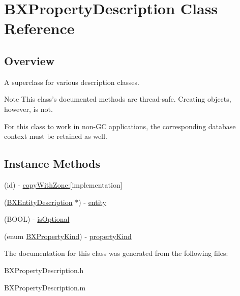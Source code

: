 \hypertarget{interface_b_x_property_description}{}\section{B\+X\+Property\+Description Class Reference}
\label{interface_b_x_property_description}


\subsection{Overview}
A superclass for various description classes. 

\begin{DoxyNote}{Note}
This class's documented methods are thread-\/safe. Creating objects, however, is not. 

For this class to work in non-\/\+G\+C applications, the corresponding database context must be retained as well. 
\end{DoxyNote}
\subsection*{Instance Methods}
\begin{DoxyCompactItemize}
\item 
\hypertarget{interface_b_x_property_description_aa7222b97f517fe220a5a3062443fab6e}{}(id) -\/ \hyperlink{interface_b_x_property_description_aa7222b97f517fe220a5a3062443fab6e}{copy\+With\+Zone\+:}{\ttfamily  \mbox{[}implementation\mbox{]}}\label{interface_b_x_property_description_aa7222b97f517fe220a5a3062443fab6e}

\item 
\hypertarget{interface_b_x_property_description_afbf668bb78c4c12fad3feb0e358c7757}{}(\hyperlink{interface_b_x_entity_description}{B\+X\+Entity\+Description} $\ast$) -\/ \hyperlink{interface_b_x_property_description_afbf668bb78c4c12fad3feb0e358c7757}{entity}\label{interface_b_x_property_description_afbf668bb78c4c12fad3feb0e358c7757}

\item 
\hypertarget{interface_b_x_property_description_a8ee6ae7def98be2424662df056eaad90}{}(B\+O\+O\+L) -\/ \hyperlink{interface_b_x_property_description_a8ee6ae7def98be2424662df056eaad90}{is\+Optional}\label{interface_b_x_property_description_a8ee6ae7def98be2424662df056eaad90}

\item 
\hypertarget{interface_b_x_property_description_a96293264d2bc612c78c41ea2cd851b3e}{}(enum \hyperlink{_b_x_constants_8h_a4640a84a78f6764e1f92041225c8e81e}{B\+X\+Property\+Kind}) -\/ \hyperlink{interface_b_x_property_description_a96293264d2bc612c78c41ea2cd851b3e}{property\+Kind}\label{interface_b_x_property_description_a96293264d2bc612c78c41ea2cd851b3e}

\end{DoxyCompactItemize}


The documentation for this class was generated from the following files\+:\begin{DoxyCompactItemize}
\item 
B\+X\+Property\+Description.\+h\item 
B\+X\+Property\+Description.\+m\end{DoxyCompactItemize}
